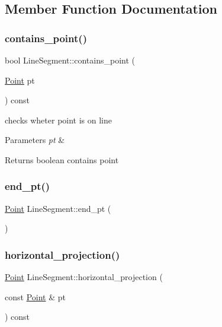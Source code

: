 \subsection{Member Function Documentation}
\mbox{\label{class_line_segment_a8dc46fa1dd259befff8cea92232e2a29}} 
\subsubsection{\texorpdfstring{contains\_point()}{contains\_point()}}
{\footnotesize\ttfamily bool Line\+Segment\+::contains\+\_\+point (\begin{DoxyParamCaption}\item[{\mbox{\hyperlink{class_point}{Point}}}]{pt }\end{DoxyParamCaption}) const}

checks wheter point is on line 
\begin{DoxyParams}{Parameters}
{\em pt} & \\
\hline
\end{DoxyParams}
\begin{DoxyReturn}{Returns}
boolean contains point 
\end{DoxyReturn}
\mbox{\label{class_line_segment_a7af4d5a73aa4f89275cda6ea2b5cfbb2}} 
\subsubsection{\texorpdfstring{end\_pt()}{end\_pt()}}
{\footnotesize\ttfamily \mbox{\hyperlink{class_point}{Point}} Line\+Segment\+::end\+\_\+pt (\begin{DoxyParamCaption}{ }\end{DoxyParamCaption})}

\mbox{\label{class_line_segment_a25c84a7d07cfd4b594a0fd7b2b37dd18}} 
\subsubsection{\texorpdfstring{horizontal\_projection()}{horizontal\_projection()}}
{\footnotesize\ttfamily \mbox{\hyperlink{class_point}{Point}} Line\+Segment\+::horizontal\+\_\+projection (\begin{DoxyParamCaption}\item[{const \mbox{\hyperlink{class_point}{Point}} \&}]{pt }\end{DoxyParamCaption}) const}

